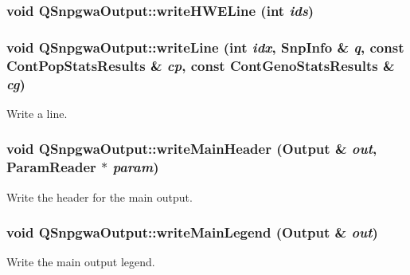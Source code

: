 \label{classQSnpgwaOutput_abeeb5f390c652631a711d1aa1f847d87}
\hypertarget{classQSnpgwaOutput_a9574fd93e422682b25033e41a9c3b72b}{
\subsubsection[{writeHWELine}]{\setlength{\rightskip}{0pt plus 5cm}void QSnpgwaOutput::writeHWELine (int {\em ids})}}
\label{classQSnpgwaOutput_a9574fd93e422682b25033e41a9c3b72b}
\hypertarget{classQSnpgwaOutput_a336d56863a352e38d8a7e5ad1b340cae}{
\subsubsection[{writeLine}]{\setlength{\rightskip}{0pt plus 5cm}void QSnpgwaOutput::writeLine (int {\em idx}, \/  {\bf SnpInfo} \& {\em q}, \/  const {\bf ContPopStatsResults} \& {\em cp}, \/  const {\bf ContGenoStatsResults} \& {\em cg})}}
\label{classQSnpgwaOutput_a336d56863a352e38d8a7e5ad1b340cae}
Write a line. \hypertarget{classQSnpgwaOutput_a5feff7620e8e5ba31ea11f2386f98538}{
\subsubsection[{writeMainHeader}]{\setlength{\rightskip}{0pt plus 5cm}void QSnpgwaOutput::writeMainHeader ({\bf Output} \& {\em out}, \/  {\bf ParamReader} $\ast$ {\em param})}}
\label{classQSnpgwaOutput_a5feff7620e8e5ba31ea11f2386f98538}
Write the header for the main output. \hypertarget{classQSnpgwaOutput_a8dd9ee1d5afed7e6eb72d1aa525081eb}{
\subsubsection[{writeMainLegend}]{\setlength{\rightskip}{0pt plus 5cm}void QSnpgwaOutput::writeMainLegend ({\bf Output} \& {\em out})}}
\label{classQSnpgwaOutput_a8dd9ee1d5afed7e6eb72d1aa525081eb}
Write the main output legend. 

